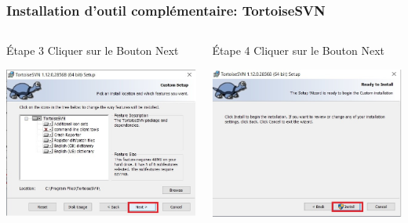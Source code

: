 \documentclass{beamer}
\begin{document}
\begin{frame}
\frametitle{Installation d'outil complémentaire: TortoiseSVN}
  \begin{columns}[T]
    \begin{column}{.4\textwidth}
     \begin{block}{Étape 3}
Cliquer sur le Bouton \alert{Next}
    \end{block}
     \includegraphics[width=\textwidth]{../images/intalstp3.jpg}
    \end{column}
    \begin{column}{.4\textwidth}
     \begin{block}{Étape 4}
Cliquer sur le Bouton \alert{Next}
    \end{block}
     \includegraphics[width=\textwidth]{../images/intalstp4.jpg}
    \end{column}
  \end{columns}
\end{frame}
\end{document}
